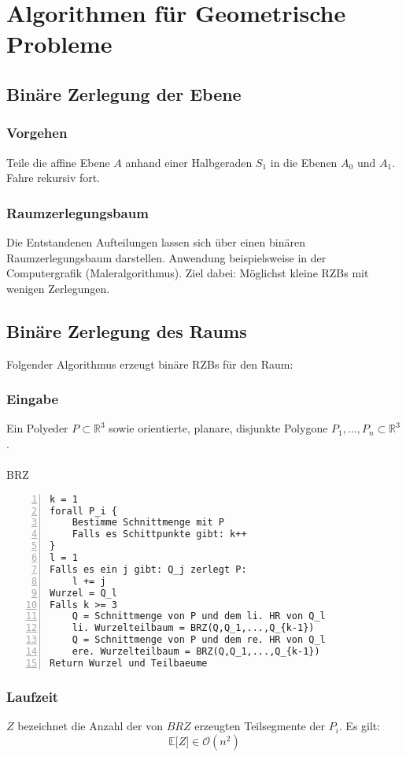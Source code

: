 \section{Algorithmen für Geometrische Probleme}

\subsection{Binäre Zerlegung der Ebene}

\subsubsection{Vorgehen}
Teile die affine Ebene \(A\) anhand einer Halbgeraden \(S_1\) in die Ebenen \(A_0\) und \(A_1\). Fahre rekursiv fort.

\subsubsection{Raumzerlegungsbaum}
Die Entstandenen Aufteilungen lassen sich über einen binären Raumzerlegungsbaum darstellen. Anwendung beispielsweise in der Computergrafik (Maleralgorithmus).
Ziel dabei: Möglichst kleine RZBs mit wenigen Zerlegungen.


\subsection{Binäre Zerlegung des Raums}
Folgender Algorithmus erzeugt binäre RZBs für den Raum:

\subsubsection{Eingabe}
Ein Polyeder \(P \subset \mathbb{R}^3\) sowie orientierte, planare, disjunkte Polygone \(P_1,...,P_n \subset \mathbb{R}^3\).
\\\\
BRZ
\begin{lstlisting}[frame=single,numbers=left]
k = 1
forall P_i {
	Bestimme Schnittmenge mit P
	Falls es Schittpunkte gibt: k++
}
l = 1
Falls es ein j gibt: Q_j zerlegt P:
	l += j
Wurzel = Q_l
Falls k >= 3
	Q = Schnittmenge von P und dem li. HR von Q_l
	li. Wurzelteilbaum = BRZ(Q,Q_1,...,Q_{k-1})
	Q = Schnittmenge von P und dem re. HR von Q_l
	ere. Wurzelteilbaum = BRZ(Q,Q_1,...,Q_{k-1})
Return Wurzel und Teilbaeume
\end{lstlisting}

\subsubsection{Laufzeit}
\(Z\) bezeichnet die Anzahl der von \(BRZ\) erzeugten Teilsegmente der \(P_i\). Es gilt:
\[\mathbb{E}\lbrack Z \rbrack \in \mathcal{O}(n^2)\]


